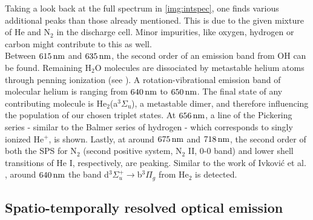 \documentclass[a4paper,10pt,twoside]{article}
\newcommand{\ix}[1]{_\text{#1}}
\begin{document}
			Taking a look back at the full spectrum in \autoref{img:intspec}, one finds various additional peaks than those already mentioned. This is due to the given mixture of He and N$_2$ in the discharge cell. Minor impurities, like oxygen, hydrogen or carbon might contribute to this as well.\\
			Between $\unit[615]{nm}$ and $\unit[635]{nm}$, the second order of an emission band from OH can be found. Remaining H$\ix{2}$O molecules are dissociated by metastable helium atoms through penning ionization (see \cite{brandenburg2004raeumlich}). A rotation-vibrational emission band of molecular helium is ranging from $\unit[640]{nm}$ to $\unit[650]{nm}$. The final state of any contributing molecule is He$\ix{2}$(a$^{3}\Sigma\ix{u}$), a metastable dimer, and therefore influencing the population of our chosen triplet states. At $\unit[656]{nm}$, a line of the Pickering series - similar to the Balmer series of hydrogen - which corresponds to singly ionized He$^+$, is shown. Lastly, at around $\unit[675]{nm}$ and $\unit[718]{nm}$, the second order of both the SPS for N$\ix{2}$ (second positive system, N$\ix{2}$ II, 0-0 band) and lower shell transitions of He I, respectively, are peaking.	Similar to the work of Ivkovi{\'c} et al. \cite{linratio1_14}, around $\unit[640]{nm}$ the band d$^3\Sigma^+_u\rightarrow$b$^3\Pi_g$ from He$_2$ is detected.
		
		\subsection{Spatio-temporally resolved optical emission}\label{subsec:stroe}
		
\end{document}
